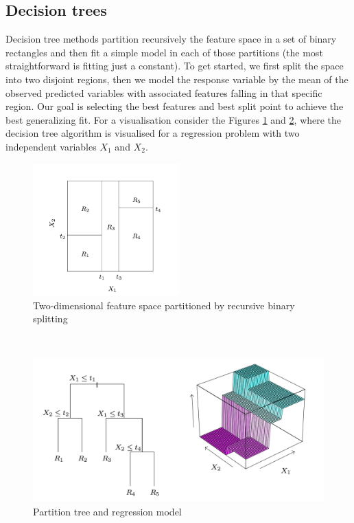 \subsection{Decision trees}
Decision tree methods partition recursively the feature space in a set of binary rectangles and then fit a simple model in each of those partitions (the most straightforward is fitting just a constant).
To get started, we first split the space into two disjoint regions, then we model the response variable by the mean of the observed predicted variables with associated features falling in that specific region. Our goal is selecting the best features and best split point to achieve the best generalizing fit.
For a visualisation consider the Figures \ref{fig:elements_statistical_learning1} and \ref{fig:elements_statistical_learning2}, where the decision tree algorithm is visualised for a regression problem with two independent variables $X_1$ and $X_2$.
\begin{figure}
    \includegraphics[width=0.5\textwidth]{images/elsii1.png}
    \caption{Two-dimensional feature space partitioned by recursive binary splitting \cite{hastie2009elements}}
    \label{fig:elements_statistical_learning1}
  \end{figure}
\\
\begin{figure}
\includegraphics[width=1\textwidth]{images/elsii2.png}
\caption{Partition tree and regression model \cite{hastie2009elements}}
\label{fig:elements_statistical_learning2}
\end{figure}
